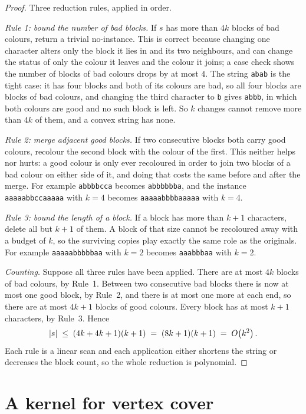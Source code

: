 \begin{proof}
Three reduction rules, applied in order.

\emph{Rule 1: bound the number of bad blocks.} If $s$ has more than $4k$ blocks
of bad colours, return a trivial no-instance. This is correct because changing
one character alters only the block it lies in and its two neighbours, and can
change the status of only the colour it leaves and the colour it joins; a case
check shows the number of
blocks of bad colours drops by at most $4$. The string \texttt{abab} is the
tight case: it has four blocks and both of its colours are bad, so all four
blocks are blocks of bad colours, and changing the third character to
\texttt{b} gives \texttt{abbb}, in which both colours are good and no such block
is left. So $k$ changes cannot remove more
than $4k$ of them, and a convex string has none.

\emph{Rule 2: merge adjacent good blocks.} If two consecutive blocks both carry
good colours, recolour the second block with the colour of the first. This
neither helps nor hurts: a good colour is only ever recoloured in order to join
two blocks of a bad colour on either side of it, and doing that costs the same
before and after the merge. For example \texttt{abbbbcca} becomes
\texttt{abbbbbba}, and the instance \texttt{aaaaabbccaaaaa} with $k = 4$ becomes
\texttt{aaaaabbbbaaaaa} with $k = 4$.

\emph{Rule 3: bound the length of a block.} If a block has more than $k+1$
characters, delete all but $k+1$ of them. A block of that size cannot be
recoloured away with a budget of $k$, so the surviving copies play exactly the
same role as the originals. For example \texttt{aaaaabbbbbaa} with $k = 2$
becomes \texttt{aaabbbaa} with $k = 2$.

\emph{Counting.} Suppose all three rules have been applied. There are at most
$4k$ blocks of bad colours, by Rule~1. Between two consecutive bad blocks there
is now at most one good block, by Rule~2, and there is at most one more at each
end, so there are at most $4k+1$ blocks of good colours. Every block has at most
$k+1$ characters, by Rule~3. Hence
\[ |s| \;\le\; (4k + 4k + 1)(k+1) \;=\; (8k+1)(k+1) \;=\; O\!\left(k^2\right). \]
Each rule is a linear scan and each application either shortens the string or
decreases the block count, so the whole reduction is polynomial.
\end{proof}

\section{A kernel for vertex cover}
\label{sec:fpt-vc-kernel}

